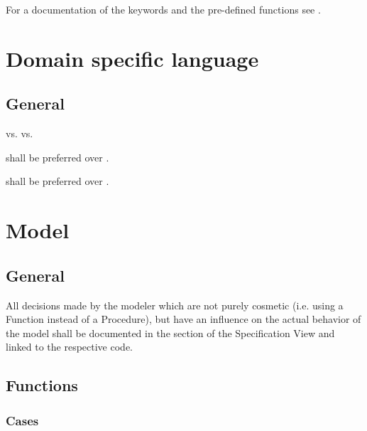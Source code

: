 \documentclass[draft]{efsguide}
\begin{document}
For a documentation of the keywords and the pre-defined functions see \cite{efstechdesign}.



\chapter{Domain specific language}

\section{General}
\begin{rules}
\item {}  vs.  vs. \code{[]} 
\item {} shall be preferred over . 
\item {} shall be preferred over . 
\end{rules}


\chapter{Model}

\section{General}

\begin{rules}
\item \label{rule:model_general_design_choices} All decisions made by the modeler which are not purely cosmetic (i.e. using a Function instead of a Procedure), but have an influence on the actual behavior of the model shall be documented in the section  of the Specification View and linked to the respective code. 

\end{rules}


\section{Functions}
\subsection{Cases}
\end{document}

